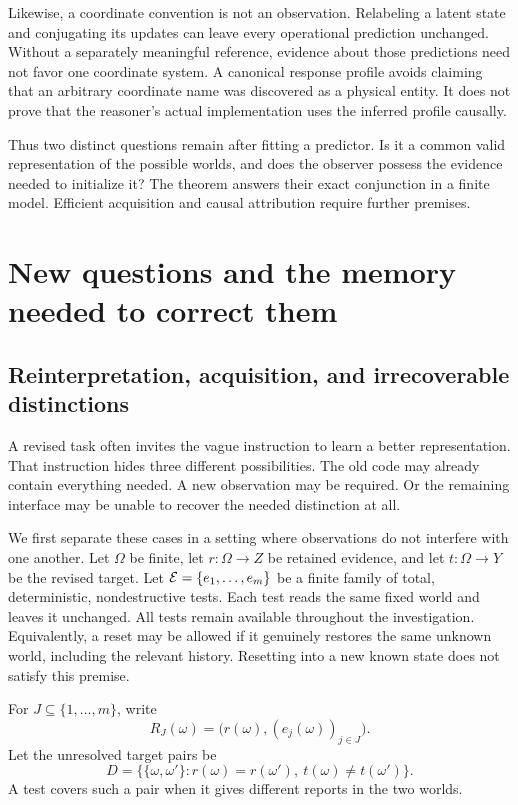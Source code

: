 Likewise, a coordinate convention is not an observation. Relabeling a latent state and conjugating its updates can leave every operational prediction unchanged. Without a separately meaningful reference, evidence about those predictions need not favor one coordinate system. A canonical response profile avoids claiming that an arbitrary coordinate name was discovered as a physical entity. It does not prove that the reasoner's actual implementation uses the inferred profile causally.

Thus two distinct questions remain after fitting a predictor. Is it a common valid representation of the possible worlds, and does the observer possess the evidence needed to initialize it? The theorem answers their exact conjunction in a finite model. Efficient acquisition and causal attribution require further premises.


\FloatBarrier
\chapter{New questions and the memory needed to correct them}\label{GA:book:chapter-26}

\section{Reinterpretation, acquisition, and irrecoverable distinctions}\label{GA:sec:trichotomy}
A revised task often invites the vague instruction to learn a better representation. That instruction hides three different possibilities. The old code may already contain everything needed. A new observation may be required. Or the remaining interface may be unable to recover the needed distinction at all.

We first separate these cases in a setting where observations do not interfere with one another. Let $\Omega$ be finite, let $r:\Omega\to Z$ be retained evidence, and let $t:\Omega\to Y$ be the revised target. Let $\mathcal E=\{e_1,\ldots,e_m\}$ be a finite family of total, deterministic, nondestructive tests. Each test reads the same fixed world and leaves it unchanged. All tests remain available throughout the investigation. Equivalently, a reset may be allowed if it genuinely restores the same unknown world, including the relevant history. Resetting into a new known state does not satisfy this premise.

For $J\subseteq\{1,\ldots,m\}$, write
\[
R_J(\omega)=\bigl(r(\omega),(e_j(\omega))_{j\in J}\bigr).
\]
Let the unresolved target pairs be
\[
D=\{\{\omega,\omega'\}:r(\omega)=r(\omega'),\ t(\omega)\ne t(\omega')\}.
\]
A test covers such a pair when it gives different reports in the two worlds.


